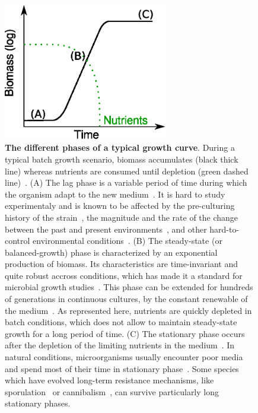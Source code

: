 \begin{figure}[p]
\centering
\includegraphics[height=6cm]{./Fig/Chapter1/growth_curve}
\caption{
\textbf{The different phases of a typical growth curve}.
During a typical batch growth scenario, biomass accumulates (black thick line) whereas nutrients are consumed until depletion (green dashed line)~\cite{schaechter_microbe_2006}.
(A) The lag phase is a variable period of time during which the organism adapt to the new medium~\cite{swinnen_predictive_2004}.
It is hard to study experimentaly and is known to be affected by the pre-culturing history of the strain~\cite{ng_damage_1962,dufrenne_effect_1997,shaw_effect_1967}, the magnitude and the rate of the change between the past and present environments~\cite{mcmeekin_predictive_2002}, and other hard-to-control environmental conditions~\cite{cheroutre-vialette_application_2002}.
(B) The steady-state (or balanced-growth) phase is characterized by an exponential production of biomass.
Its characteristics are time-invariant and quite robust accross conditions, which has made it a standard for microbial growth studies~\cite{schaechter_microbe_2006}.
This phase can be extended for hundreds of generations in continuous cultures, by the constant renewable of the medium~\cite{borirak_molecular_2014,herbert_continuous_1956,wang_robust_2010}.
As represented here, nutrients are quickly depleted in batch conditions, which does not allow to maintain steady-state growth for a long period of time.
(C) The stationary phase occurs after the depletion of the limiting nutrients in the medium~\cite{chubukov_environmental_2014,schaechter_microbe_2006}.
In natural conditions, microorganisms usually encounter poor media and spend most of their time in stationary phase~\cite{mcarthur_microbial_2006,menge_nitrogen_2012,hobbie_microbes_2013}.
Some species which have evolved long-term resistance mechanisms, like sporulation~\cite{stragier_molecular_1996} or cannibalism~\cite{gonzalez-pastor_cannibalism:_2011}, can survive particularly long stationary phases.
}
\label{fig:growth_curve}
\end{figure}


